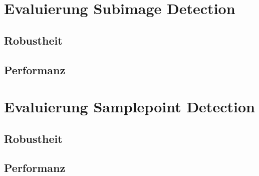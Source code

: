 


\section{Evaluierung Subimage Detection}
\label{sec:evaluierung_subimage}

    \subsection{Robustheit}
    \label{subsec:subimage_robustheit}

    \subsection{Performanz}
    \label{subsec:subimage_performanz}

\section{Evaluierung Samplepoint Detection}
\label{sec:evaluierung_samplepoint}

    \subsection{Robustheit}
    \label{subsec:samplepoint_robustheit}    

    \subsection{Performanz}
    \label{subsec:samplepoint_performanz}
